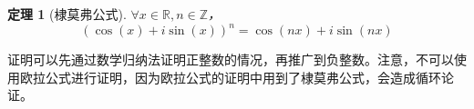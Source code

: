 \documentclass[a4paper,openany]{ctexbook}
\newtheorem{thmlevel1}{定理}
\begin{document}

\begin{thmlevel1}[棣莫弗公式]
    \(\forall x\in \mathbb{R}, n\in \mathbb{Z}\)，\[( \cos (x) + i \sin (x) )^n = \cos (nx) + i \sin (nx)\]
\end{thmlevel1}

证明可以先通过数学归纳法证明正整数的情况，再推广到负整数。注意，不可以使用欧拉公式进行证明，因为欧拉公式的证明中用到了棣莫弗公式，会造成循环论证。
\end{document}
